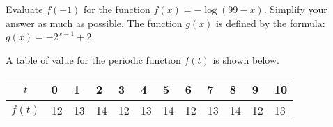\documentclass[11pt,answers]{exam}
\let\originalleft\left
\let\originalright\right
\renewcommand{\left}{\mathopen{}\mathclose\bgroup\originalleft}
\renewcommand{\right}{\aftergroup\egroup\originalright}
\begin{document}
\begin{questions}

\question[2] Evaluate
$f(-1)$ for the function
$\displaystyle f(x) = -\log(99-x)$. Simplify your answer as much as possible. \dotfill
\question The function $g(x)$ is defined by the formula: $\displaystyle g(x) = -2^{x-1} + 2$. 
\bonusquestion[1] A table of value for the periodic function $f(t)$ is shown below. 

\begin{minipage}{\linewidth}
	\centering
	\begin{tabularx}{0.8\textwidth}{|X|X|X|X|X|X|X|X|X|X|X|X|X|}
		\hline
		\multicolumn{2}{|c|}{$t$}         &0&1& 2 & 3 & 4 & 5 & 6 & 7 &8&9&10\\ \hline
		\multicolumn{2}{|c|}{$f(t)$}   & 12&13 & 14    &12     &13     &14     &12     &13&14 &12 & 13    \\ \hline
	\end{tabularx}
\end{minipage} 
\smallskip


\end{questions}
\end{document}
